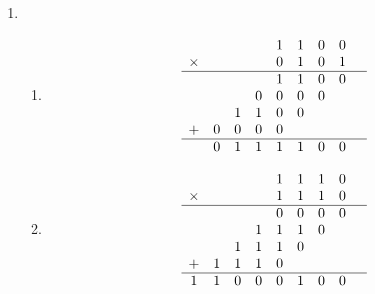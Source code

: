 \documentclass[12pt letter]{report}
\begin{document}
{\begin{enumerate}
\begin{enumerate}
          \end{enumerate}
    \item
          \begin{enumerate}
            \item
                  \begin{align*}
                    \begin{array}{c cccccccc}
                             &   &   &   & 1 & 1 & 0 & 0 & \\
                      \times &   &   &   & 0 & 1 & 0 & 1 & \\
                      \hline
                             &   &   &   & 1 & 1 & 0 & 0 & \\
                             &   &   & 0 & 0 & 0 & 0 &   & \\
                             &   & 1 & 1 & 0 & 0 &   &   & \\
                      +      & 0 & 0 & 0 & 0 &   &   &   & \\
                      \hline
                             & 0 & 1 & 1 & 1 & 1 & 0 & 0 & \\
                    \end{array}
                  \end{align*}
            \item
                  \begin{align*}
                    \begin{array}{c cccccccc}
                             &   &   &   & 1 & 1 & 1 & 0 & \\
                      \times &   &   &   & 1 & 1 & 1 & 0 & \\
                      \hline
                             &   &   &   & 0 & 0 & 0 & 0 & \\
                             &   &   & 1 & 1 & 1 & 0 &   & \\
                             &   & 1 & 1 & 1 & 0 &   &   & \\
                      +      & 1 & 1 & 1 & 0 &   &   &   & \\
                      \hline
                      1      & 1 & 0 & 0 & 0 & 1 & 0 & 0 & \\
                    \end{array}
                  \end{align*}
          \end{enumerate}
  \end{enumerate}
}
\end{document}
